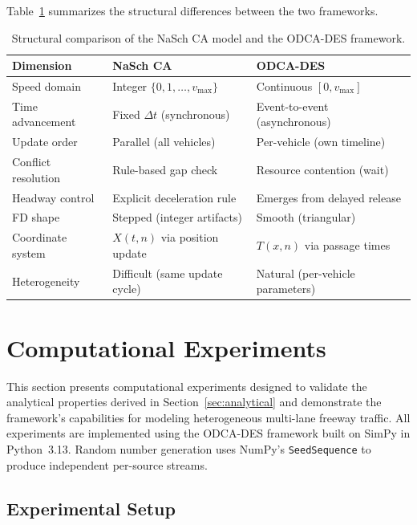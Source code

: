 \documentclass[review,number]{elsarticle}
\begin{document}
Table~\ref{tab:comparison_summary} summarizes the structural differences between the two frameworks.

\begin{table}[ht]
\centering
\caption{Structural comparison of the NaSch CA model and the ODCA-DES framework.}
\label{tab:comparison_summary}
\begin{tabular}{@{}lll@{}}
\toprule
Dimension & NaSch CA & ODCA-DES \\
\midrule
Speed domain & Integer $\{0,1,\ldots,v_{\max}\}$ & Continuous $[0, v_{\max}]$ \\
Time advancement & Fixed $\Delta t$ (synchronous) & Event-to-event (asynchronous) \\
Update order & Parallel (all vehicles) & Per-vehicle (own timeline) \\
Conflict resolution & Rule-based gap check & Resource contention (wait) \\
Headway control & Explicit deceleration rule & Emerges from delayed release \\
FD shape & Stepped (integer artifacts) & Smooth (triangular) \\
Coordinate system & $X(t,n)$ via position update & $T(x,n)$ via passage times \\
Heterogeneity & Difficult (same update cycle) & Natural (per-vehicle parameters) \\
\bottomrule
\end{tabular}
\end{table}


\section{Computational Experiments}
\label{sec:experiments}

This section presents computational experiments designed to validate the analytical properties derived in Section~\ref{sec:analytical} and demonstrate the framework's capabilities for modeling heterogeneous multi-lane freeway traffic. All experiments are implemented using the ODCA-DES framework built on SimPy \citep{simpy2023} in Python~3.13. Random number generation uses NumPy's \texttt{SeedSequence} to produce independent per-source streams.

\subsection{Experimental Setup}
\label{sec:exp_setup}
\end{document}
